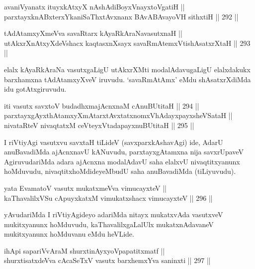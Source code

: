 \begin{shl}
avaniVyanatx ituyxkAtxyX nAshAdiBoyxV\s nayxtoVgatiH || \\
parxtayxknABxterxYkaniSaThxtAvxnanx BAvABAvayoVH sithxtiH \hfill || 292 ||  
\end{shl}



\begin{shl}
tAdAtamxyXmeVva savaRtarx kAyaRkAraNavasutxnaH || \\
utAkxrXnAtxyXdeVshacx kaqtasxnXsayx savaRmAtemxVtishAsatxrXtaH \hfill || 293 ||  
\end{shl}

\begin{artha}
elalx kAyaRkAraNa vasutxgaLigU utAkxrXMti modalAdavugaLigU elalxdakukx
barxhamxna tAdAtamxyXveV iruvudu. `savaRmAtAmx' eMdu shAsatxrXdiMda idu gotAtxgiruvudu.
\end{artha}

\begin{shl}
iti vasutx savxtoV budadhxmajAcnxnaM cAnuBUtitaH \hfill || 294 ||  \\
parxtayxgAyxthAtamxyXmAtarxtAvxtatxnomxVhAdayxpayxsheVSataH || \\
nivataRteV nivaqtatxM ceVteyxVtadapayxnuBUtitaH \hfill || 295 ||  
\end{shl}

\begin{artha}
I riVtiyAgi vasutxvu savxtaH tiLideV (savxparxkAshavAgi) ide, AdarU
anuBavadiMda ajAcnxnavU kANuvudu, parxtayxgAtamxna nija savxrUpaveV
AgiruvudariMda adara ajAcnxna modalAdavU saha elalxvU nivaqtitxyanunx
hoMduvudu, nivaqtitxhoMdideyeMbudU saha anuBavadiMda (tiLiyuvudu).
\end{artha}

\begin{shl}
yata EvamatoV vasutx mukatxmeVva vimucayxteV || \\
kaThavalilxVSu cApuyxkatxM vimukatxshacx vimucayxteV \hfill || 296 ||  
\end{shl}

\begin{artha}
yAvudariMda I riVtiyAgideyo adariMda nitayx mukatxvAda vasutxveV
mukitxyanunx hoMduvudu, kaThavalilxgaLalUlx mukatxnAdavaneV mukitxyanunx hoMduvanu eMdu heVLide.
\end{artha}

\begin{shl}
ihApi sapariVvAraM shurxtinAyxyoVpapatitxmatf || \\
shurxtisatxdeVva cA\s \s caSeTxV vasutx barxhemxYva saninxti \hfill || 297 ||  
\end{shl}

